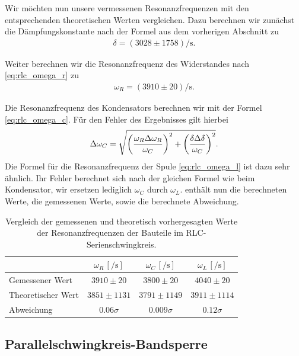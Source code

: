 Wir möchten nun unsere vermessenen Resonanzfrequenzen mit den entsprechenden theoretischen Werten vergleichen. Dazu berechnen wir zunächst die Dämpfungskonstante nach der Formel aus dem vorherigen Abschnitt zu
\begin{align}
  \delta = (3028 \pm 1758)\si{\per\second}.
\end{align}

Weiter berechnen wir die Resonanzfrequenz des Widerstandes nach \eqref{eq:rlc_omega_r} zu
\begin{align}
  \omega_R = (3910 \pm 20)\si{\per\second}.
\end{align}

Die Resonanzfrequenz des Kondensators berechnen wir mit der Formel \eqref{eq:rlc_omega_c}. Für den Fehler des Ergebnisses gilt hierbei
\begin{align}
  \Delta \omega_C = \sqrt{\qty(\frac{\omega_R \Delta \omega_R}{\omega_C})^2 + \qty(\frac{\delta \Delta \delta}{\omega_C})^2}.
\end{align}
Die Formel für die Resonanzfrequenz der Spule \eqref{eq:rlc_omega_l} ist dazu sehr ähnlich. Ihr Fehler berechnet sich nach der gleichen Formel wie beim Kondensator, wir ersetzen lediglich $\omega_C$ durch $\omega_L$.  enthält nun die berechneten Werte, die gemessenen Werte, sowie die berechnete Abweichung.

\renewcommand{\arraystretch}{1.5}
\begin{table}[H]
  \centering
  \caption{Vergleich der gemessenen und theoretisch vorhergesagten Werte der Resonanzfrequenzen der Bauteile im RLC-Serienschwingkreis.}\vspace*{0.5em}
  \label{tab:omega_vergleich}
  \begin{tabular}{|l|c|c|c|}
    \hline
    & $\omega_R\,[\si{\per\second}]$ & $\omega_C\,[\si{\per\second}]$ & $\omega_L\,[\si{\per\second}]$\\\hline
    Gemessener Wert & $3910 \pm 20$ & $3800 \pm 20$ & $4040 \pm 20$ \\\hline
    Theoretischer Wert & $3851 \pm 1131$ & $3791 \pm 1149$ & $3911 \pm 1114$\\\hline\hline
    Abweichung & $0.06\sigma$ & $0.009\sigma$ & $0.12\sigma$\\
    \hline
  \end{tabular}
\end{table}
\renewcommand{\arraystretch}{1}

\subsection{Parallelschwingkreis-Bandsperre}

